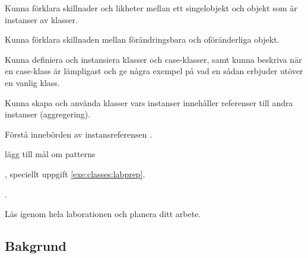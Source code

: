 

\Lab{\LabWeekSIX}

\begin{Goals}
\item Kunna förklara skillnader och likheter mellan ett singelobjekt och objekt som är instanser av klasser.
\item Kunna förklara skillnaden mellan förändringsbara och oföränderliga objekt.
\item Kunna definiera och instansiera klasser och case-klasser, samt kunna beskriva när en case-klass är lämpligast och ge några exempel på vad en sådan erbjuder utöver en vanlig klass.
\item Kunna skapa och använda klasser vars instanser innehåller referenser till andra instanser (aggregering).
\item Förstå innebörden av instansreferensen .
\item \TODO lägg till mål om patterns
\end{Goals}

\begin{Preparations}
\item {}, speciellt uppgift \ref{exe:classes:labprep}.
\item {}.
\item Läs igenom hela laborationen och planera ditt arbete.
\end{Preparations}

\subsection{Bakgrund}

